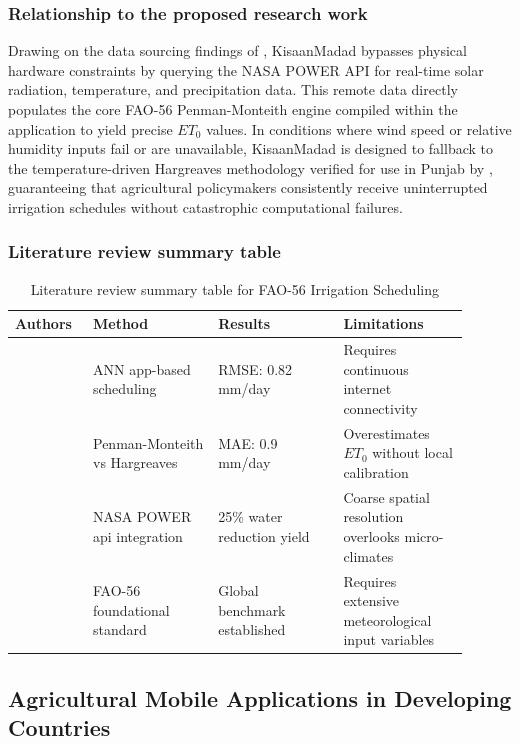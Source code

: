 \subsubsection{Relationship to the proposed research work}
Drawing on the data sourcing findings of \cite{navarro2022smart}, KisaanMadad bypasses physical hardware constraints by querying the NASA POWER API for real-time solar radiation, temperature, and precipitation data. This remote data directly populates the core FAO-56 Penman-Monteith engine \cite{allen1998crop} compiled within the application to yield precise $ET_0$ values. In conditions where wind speed or relative humidity inputs fail or are unavailable, KisaanMadad is designed to fallback to the temperature-driven Hargreaves methodology verified for use in Punjab by \cite{tariq2021evaluation}, guaranteeing that agricultural policymakers consistently receive uninterrupted irrigation schedules without catastrophic computational failures.

\subsubsection{Literature review summary table}
\begin{table}[htbp]
  \centering
  \caption{Literature review summary table for FAO-56 Irrigation Scheduling}
  \label{tab:irrigation}
  \begin{tabular}{p{0.15\linewidth} p{0.25\linewidth} p{0.25\linewidth} p{0.25\linewidth}}
    \toprule
    \textbf{Authors} & \textbf{Method} & \textbf{Results} & \textbf{Limitations} \\
    \midrule
    \cite{ferreira2020smartphone} & ANN app-based scheduling & RMSE: 0.82 mm/day & Requires continuous internet connectivity \\
    \cite{tariq2021evaluation} & Penman-Monteith vs Hargreaves & MAE: 0.9 mm/day & Overestimates $ET_0$ without local calibration \\
    \cite{navarro2022smart} & NASA POWER api integration & 25\% water reduction yield & Coarse spatial resolution overlooks micro-climates \\
    \cite{allen1998crop} & FAO-56 foundational standard & Global benchmark established & Requires extensive meteorological input variables \\
    \bottomrule
  \end{tabular}
\end{table}

\subsection{Agricultural Mobile Applications in Developing Countries}

